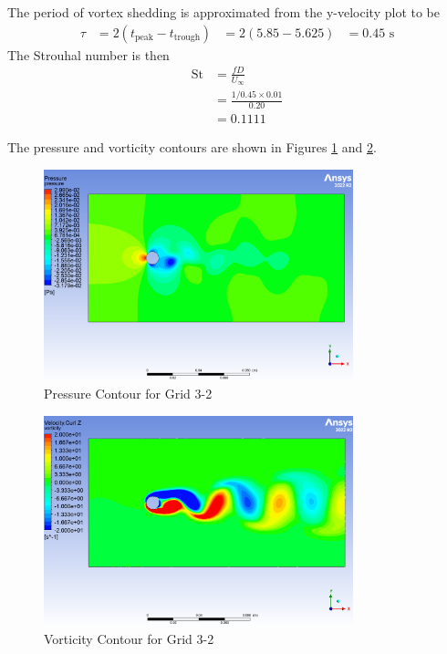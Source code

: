 The period of vortex shedding is approximated from the y-velocity plot to be
\begin{align*}
    \tau &= 2(t_{\text{peak}} - t_{\text{trough}})
    &= 2(5.85 - 5.625)
    &= 0.45 \text{ s}
\end{align*}
The Strouhal number is then
\begin{align*}
    \text{St} &= \frac{fD}{U_\infty} \\
    &= \frac{1/0.45 \times 0.01}{0.20} \\ 
    &= \boxed{0.1111}
\end{align*}

The pressure and vorticity contours are shown in Figures \ref{fig:pressure contour grid 3 2} and \ref{fig:vorticity contour grid 3 2}.
\begin{figure}[H]
    \centering
    \includegraphics[width=0.8\textwidth]{Questions/Figures/pressure contour grid 3 2.png}
    \caption{Pressure Contour for Grid 3-2}
    \label{fig:pressure contour grid 3 2}
\end{figure}
\begin{figure}[H]
    \centering
    \includegraphics[width=0.8\textwidth]{Questions/Figures/vorticity contour grid 3 2.png}
    \caption{Vorticity Contour for Grid 3-2}
    \label{fig:vorticity contour grid 3 2}
\end{figure}


